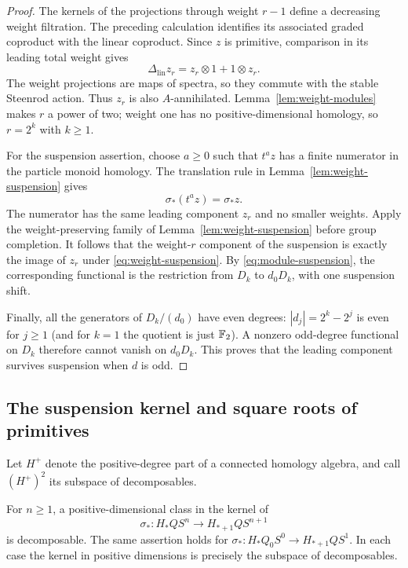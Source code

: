 \begin{proof}
The kernels of the projections through weight $r-1$ define a decreasing
weight filtration. The preceding calculation identifies its associated
graded coproduct with the linear coproduct.
Since $z$ is primitive, comparison in its leading total weight gives
\[
 \Delta_{\mathrm{lin}}z_r=z_r\otimes1+1\otimes z_r.
\]
The weight projections are maps of spectra, so they commute with
the stable Steenrod action. Thus $z_r$ is also $A$-annihilated.
Lemma~\ref{lem:weight-modules} makes $r$ a power of two; weight
one has no positive-dimensional homology, so $r=2^k$ with $k\geq1$.

For the suspension assertion, choose $a\geq0$ such that $t^az$
has a finite numerator in the particle monoid homology. The
translation rule in Lemma~\ref{lem:weight-suspension} gives
\[
 \sigma_*(t^az)=\sigma_*z.
\]
The numerator has the same leading component $z_r$ and no smaller
weights. Apply the weight-preserving family of
Lemma~\ref{lem:weight-suspension} before group completion.
It follows that the weight-$r$ component of the suspension is
exactly the image of $z_r$ under
\eqref{eq:weight-suspension}. By
\eqref{eq:module-suspension}, the corresponding functional is the
restriction from $D_k$ to $d_0D_k$, with one suspension shift.

Finally, all the generators of $D_k/(d_0)$ have even degrees:
$|d_j|=2^k-2^j$ is even for $j\geq1$ (and for $k=1$ the quotient
is just $\mathbb F_2$). A nonzero odd-degree functional on $D_k$ therefore
cannot vanish on $d_0D_k$. This proves that the leading component
survives suspension when $d$ is odd.
\end{proof}

\subsection{The suspension kernel and square roots of primitives}

Let $H^+$ denote the positive-degree part of a connected homology
algebra, and call $(H^+)^2$ its subspace of decomposables.

\begin{lemma}\label{lem:suspension-kernel}
For $n\geq1$, a positive-dimensional class in the kernel of
\[
 \sigma_*:H_*QS^n\longrightarrow H_{*+1}QS^{n+1}
\]
is decomposable. The same assertion holds for
$\sigma_*:H_*Q_0S^0\to H_{*+1}QS^1$. In each case the kernel in
positive dimensions is precisely the subspace of decomposables.
\end{lemma}

